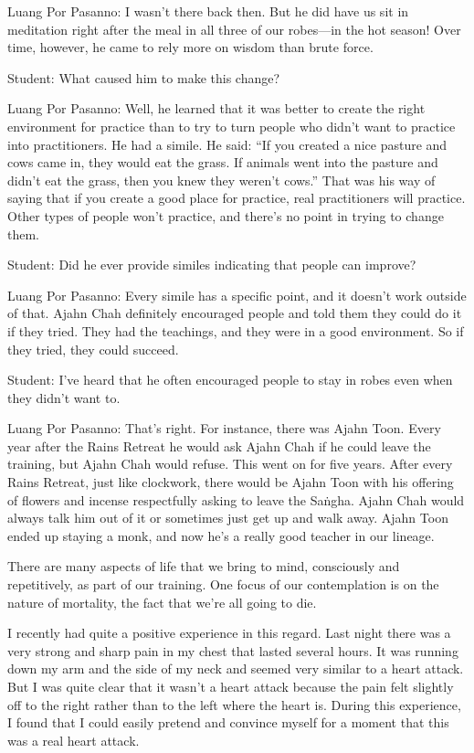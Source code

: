 Luang Por Pasanno: I wasn't there back then. But he did have us sit in 
meditation right after the meal in all three of our robes---in the hot 
season! Over time, however, he came to rely more on wisdom than brute 
force.

Student: What caused him to make this change?

Luang Por Pasanno: Well, he learned that it was better to create the 
right environment for practice than to try to turn people who didn't 
want to practice into practitioners. He had a simile. He said: ``If you 
created a nice pasture and cows came in, they would eat the grass. If 
animals went into the pasture and didn't eat the grass, then you knew 
they weren't cows.'' That was his way of saying that if you create a 
good place for practice, real practitioners will practice. Other types 
of people won't practice, and there's no point in trying to change them.

Student: Did he ever provide similes indicating that people can improve?

Luang Por Pasanno: Every simile has a specific point, and it doesn't 
work outside of that. Ajahn Chah definitely encouraged people and told 
them they could do it if they tried. They had the teachings, and they 
were in a good environment. So if they tried, they could succeed.

Student: I've heard that he often encouraged people to stay in robes 
even when they didn't want to.

Luang Por Pasanno: That's right. For instance, there was Ajahn Toon. 
Every year after the Rains Retreat he would ask Ajahn Chah if he could 
leave the training, but Ajahn Chah would refuse. This went on for five 
years. After every Rains Retreat, just like clockwork, there would be 
Ajahn Toon with his offering of flowers and incense respectfully asking 
to leave the Saṅgha. Ajahn Chah would always talk him out of it or 
sometimes just get up and walk away. Ajahn Toon ended up staying a 
monk, and now he's a really good teacher in our lineage.


There are many aspects of life that we bring to mind, consciously and 
repetitively, as part of our training. One focus of our contemplation 
is on the nature of mortality, the fact that we're all going to die.

I recently had quite a positive experience in this regard. Last night 
there was a very strong and sharp pain in my chest that lasted several 
hours. It was running down my arm and the side of my neck and seemed 
very similar to a heart attack. But I was quite clear that it wasn't a 
heart attack because the pain felt slightly off to the right rather 
than to the left where the heart is. During this experience, I found 
that I could easily pretend and convince myself for a moment that this 
was a real heart attack.

